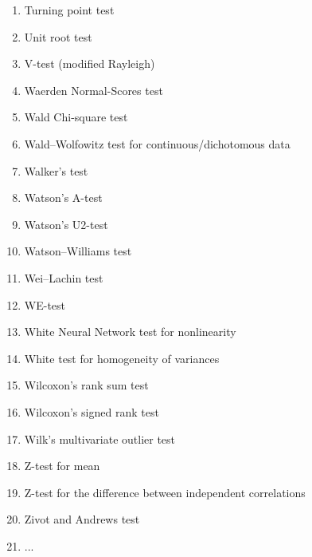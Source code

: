 \begin{itemize}
\begin{multicols}{3}
\begin{enumerate}
			\item Turning point test
			\item Unit root test
			\item V-test (modified Rayleigh)
			\item Waerden Normal-Scores test
			\item Wald Chi-square test
			\item Wald–Wolfowitz test for continuous/dichotomous data
			\item Walker's test
			\item Watson's A-test
			\item Watson's U2-test
			\item Watson–Williams test
			\item Wei–Lachin test
			\item WE-test
			\item White Neural Network test for nonlinearity
			\item White test for homogeneity of variances 
			\item Wilcoxon's rank sum test
			\item Wilcoxon's signed rank test
			\item Wilk's multivariate outlier test
			\item Z-test for mean
			\item Z-test for the difference between independent correlations
			\item Zivot and Andrews test
			\item ...
		\end{enumerate}
		\end{multicols}
		

\end{itemize}
